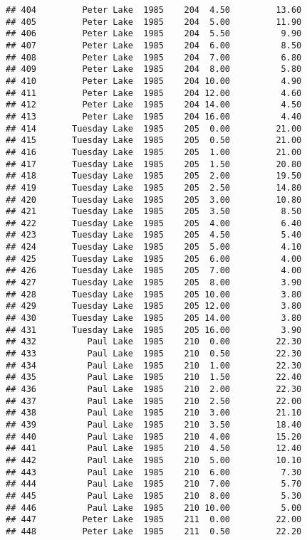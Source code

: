 \documentclass[
]{article}
\begin{document}
\begin{verbatim}
## 404         Peter Lake  1985    204  4.50         13.60
## 405         Peter Lake  1985    204  5.00         11.90
## 406         Peter Lake  1985    204  5.50          9.90
## 407         Peter Lake  1985    204  6.00          8.50
## 408         Peter Lake  1985    204  7.00          6.80
## 409         Peter Lake  1985    204  8.00          5.80
## 410         Peter Lake  1985    204 10.00          4.90
## 411         Peter Lake  1985    204 12.00          4.60
## 412         Peter Lake  1985    204 14.00          4.50
## 413         Peter Lake  1985    204 16.00          4.40
## 414       Tuesday Lake  1985    205  0.00         21.00
## 415       Tuesday Lake  1985    205  0.50         21.00
## 416       Tuesday Lake  1985    205  1.00         21.00
## 417       Tuesday Lake  1985    205  1.50         20.80
## 418       Tuesday Lake  1985    205  2.00         19.50
## 419       Tuesday Lake  1985    205  2.50         14.80
## 420       Tuesday Lake  1985    205  3.00         10.80
## 421       Tuesday Lake  1985    205  3.50          8.50
## 422       Tuesday Lake  1985    205  4.00          6.40
## 423       Tuesday Lake  1985    205  4.50          5.40
## 424       Tuesday Lake  1985    205  5.00          4.10
## 425       Tuesday Lake  1985    205  6.00          4.00
## 426       Tuesday Lake  1985    205  7.00          4.00
## 427       Tuesday Lake  1985    205  8.00          3.90
## 428       Tuesday Lake  1985    205 10.00          3.80
## 429       Tuesday Lake  1985    205 12.00          3.80
## 430       Tuesday Lake  1985    205 14.00          3.80
## 431       Tuesday Lake  1985    205 16.00          3.90
## 432          Paul Lake  1985    210  0.00         22.30
## 433          Paul Lake  1985    210  0.50         22.30
## 434          Paul Lake  1985    210  1.00         22.30
## 435          Paul Lake  1985    210  1.50         22.40
## 436          Paul Lake  1985    210  2.00         22.30
## 437          Paul Lake  1985    210  2.50         22.00
## 438          Paul Lake  1985    210  3.00         21.10
## 439          Paul Lake  1985    210  3.50         18.40
## 440          Paul Lake  1985    210  4.00         15.20
## 441          Paul Lake  1985    210  4.50         12.40
## 442          Paul Lake  1985    210  5.00         10.10
## 443          Paul Lake  1985    210  6.00          7.30
## 444          Paul Lake  1985    210  7.00          5.70
## 445          Paul Lake  1985    210  8.00          5.30
## 446          Paul Lake  1985    210 10.00          5.00
## 447         Peter Lake  1985    211  0.00         22.00
## 448         Peter Lake  1985    211  0.50         22.20

\end{verbatim}
\end{document}
